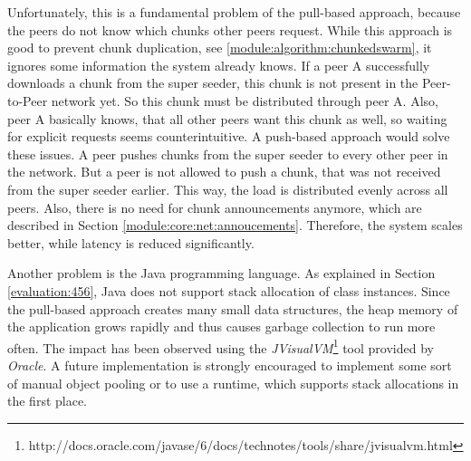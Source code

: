 Unfortunately, this is a fundamental problem of the pull-based approach, because the peers do not know which chunks other peers request. While this approach is good to prevent chunk duplication, see \ref{module:algorithm:chunkedswarm}, it ignores some information the system already knows. If a peer A successfully downloads a chunk from the super seeder, this chunk is not present in the Peer-to-Peer network yet. So this chunk must be distributed through peer A. Also, peer A basically knows, that all other peers want this chunk as well, so waiting for explicit requests seems counterintuitive. A push-based approach would solve these issues. A peer pushes chunks from the super seeder to every other peer in the network. But a peer is not allowed to push a chunk, that was not received from the super seeder earlier. This way, the load is distributed evenly across all peers. Also, there is no need for chunk announcements anymore, which are described in Section \ref{module:core:net:annoucements}. Therefore, the system scales better, while latency is reduced significantly.

Another problem is the Java programming language. As explained in Section \ref{evaluation:456}, Java does not support stack allocation of class instances. Since the pull-based approach creates many small data structures, the heap memory of the application grows rapidly and thus causes garbage collection to run more often. The impact has been observed using the \emph{JVisualVM}\footnote{http://docs.oracle.com/javase/6/docs/technotes/tools/share/jvisualvm.html} tool provided by \emph{Oracle}. A future implementation is strongly encouraged to implement some sort of manual object pooling or to use a runtime, which supports stack allocations in the first place.